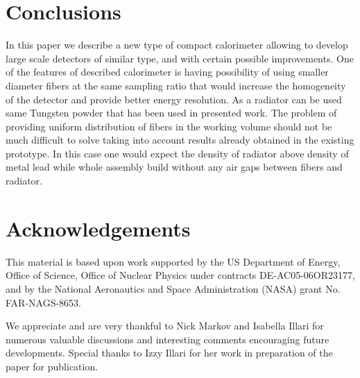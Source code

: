 
\section{Conclusions}
In this paper we describe a new type of compact calorimeter allowing to develop large scale detectors of similar type, and with certain possible improvements. One of the features of described calorimeter is having possibility of using smaller diameter fibers at the same sampling ratio that would increase the homogeneity of the detector and provide better energy resolution. As a radiator can be used same Tungsten powder that has been used in presented work. The problem of providing uniform distribution of fibers in the working volume should not be much difficult to solve taking into account results already obtained in the existing prototype. In this case one would expect the density of radiator above density of metal lead while whole assembly build without any air gaps between fibers and radiator.

\section{Acknowledgements}
This material is based upon work supported by the US Department of Energy, Office of Science, Office of Nuclear Physics under contracts DE-AC05-06OR23177, and by the National Aeronautics and Space Administration (NASA) grant No. FAR-NAGS-8653.
\newline

We appreciate and are very thankful to Nick Markov and Isabella Illari for numerous valuable discussions and interesting comments encouraging future developments. Special thanks to Izzy Illari for her work in preparation of the paper for publication.
